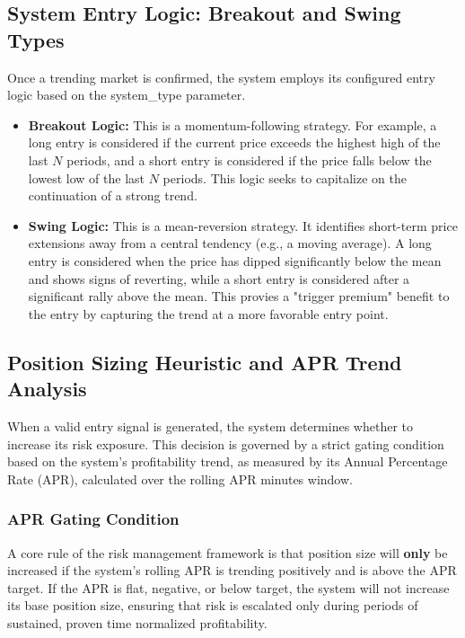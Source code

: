 \documentclass[11pt]{article}
\begin{document}
\subsection{System Entry Logic: Breakout and Swing Types}
Once a trending market is confirmed, the system employs its configured entry logic based on the system\_type parameter.
\begin{itemize}
    \item \textbf{Breakout Logic:} This is a momentum-following strategy. For example, a long entry is considered if the current price exceeds the highest high of the last $N$ periods, and a short entry is considered if the price falls below the lowest low of the last $N$ periods. This logic seeks to capitalize on the continuation of a strong trend.
    \item \textbf{Swing Logic:} This is a mean-reversion strategy. It identifies short-term price extensions away from a central tendency (e.g., a moving average). A long entry is considered when the price has dipped significantly below the mean and shows signs of reverting, while a short entry is considered after a significant rally above the mean. This provies a "trigger premium" benefit to the entry by capturing the trend at a more favorable entry point.
\end{itemize}

\subsection{Position Sizing Heuristic and APR Trend Analysis}
When a valid entry signal is generated, the system determines whether to increase its risk exposure. This decision is governed by a strict gating condition based on the system's profitability trend, as measured by its Annual Percentage Rate (APR), calculated over the rolling APR minutes window.

\subsubsection{APR Gating Condition}
A core rule of the risk management framework is that position size will \textbf{only} be increased if the system's rolling APR is trending positively and is above the APR target. If the APR is flat, negative, or below target, the system will not increase its base position size, ensuring that risk is escalated only during periods of sustained, proven time normalized profitability.
\end{document}
